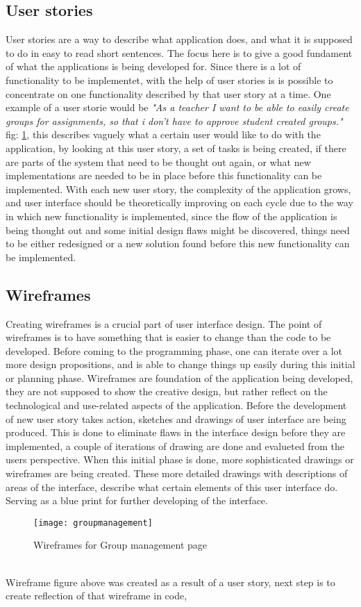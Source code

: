 \subsection{User stories}
User stories are a way to describe what application does, and what it is supposed to do in easy to read short sentences. The focus here is to give a good fundament of what the applications is being developed for. Since there is a lot of functionality to be implementet, with the help of user stories is is possible to concentrate on one functionality described by that user story at a time. One example of a user storie would be \emph{"As a teacher I want to be able to easily create groups for assignments, so that i don't have to approve student created groups."} fig: \ref{fig:groupmanagement},  this describes vaguely what a certain user would like to do with the application, by looking at this user story, a set of tasks is being created, if there are parts of the system that need to be thought out again, or what new implementations are needed to be in place before this functionality can be implemented. With each new user story, the complexity of the application grows, and user interface should be theoretically improving on each cycle due to the way in which new functionality is implemented, since the flow of the application is being thought out and some initial design flaws might be discovered, things need to be either redesigned or a new solution found before this new functionality can be implemented. 

\subsection{Wireframes}
Creating wireframes is a crucial part of user interface design. The point of wireframes is to have something that is easier to change than the code to be developed. Before coming to the programming phase, one can iterate over a lot more design propositions, and is able to change things up easily during this initial or planning phase. Wireframes are foundation of the application being developed, they are not supposed to show the creative design, but rather reflect on the technological and use-related aspects of the application. Before the development of new user story takes action, sketches and drawings of user interface are being produced. This is done to eliminate flaws in the interface design before they are implemented, a couple of iterations of drawing are done and evalueted from the users perspective. When this initial phase is done, more sophisticated drawings or wireframes are being created. These more detailed drawings with descriptions of areas of the interface, describe what certain elements of this user interface do. Serving as a blue print for further developing of the interface.
\begin{figure}[h]
  {\texttt{[image: groupmanagement]}}
  \caption{Wireframes for Group management page}
  \label{fig:groupmanagement}
\end{figure}
\\Wireframe figure above was created as a result of a user story, next step is to create reflection of that wireframe in code, 


